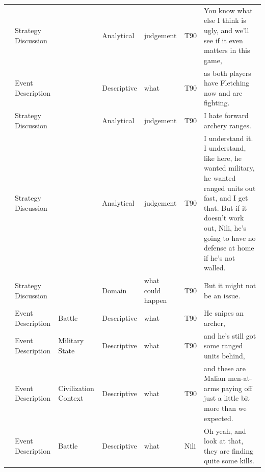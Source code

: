 {\begin{longtable}{@{}>{\theAppRow}r|L{2.3cm}L{2.2cm}L{1.4cm}L{2.2cm}L{0.5cm}U{5.6cm}@{}}
    & Strategy Discussion   &                      & Analytical  & judgement         & T90     & You know what else I think is ugly, and we'll see if it even matters in this game,                                                    \\
    & Event Description   &                      & Descriptive  & what              & T90         & as both players have Fletching now and are fighting.                                                    \\
    & Strategy Discussion   &                      & Analytical  & judgement         & T90     & I hate forward archery ranges.                                                    \\
    & Strategy Discussion   &                      & Analytical  & judgement         & T90     & I understand it. I understand, like here, he wanted military, he wanted ranged units out fast, and I get that. But if it doesn't work out, Nili, he's going to have no defense at home if he's not walled.               \\
    & Strategy Discussion   &                      & Domain      & what could happen & T90     & But it might not be an issue.                                                                                                                                                                                            \\
    & Event Description     & Battle               & Descriptive   & what              & T90     & He snipes an archer,                                                                                                                                                                                                     \\
    & Event Description     & Military State       & Descriptive   & what              & T90     & and he's still got some ranged units behind,                                                                                                                                                                             \\
    & Event Description     & Civilization Context & Descriptive   & what              & T90     & and these are Malian men-at-arms paying off just a little bit more than we expected.                                                                                                                                     \\
    & Event Description     & Battle               & Descriptive   & what              & Nili    & Oh yeah, and look at that, they are finding quite some kills.                                                                                                                                                            \\

\end{longtable}}
